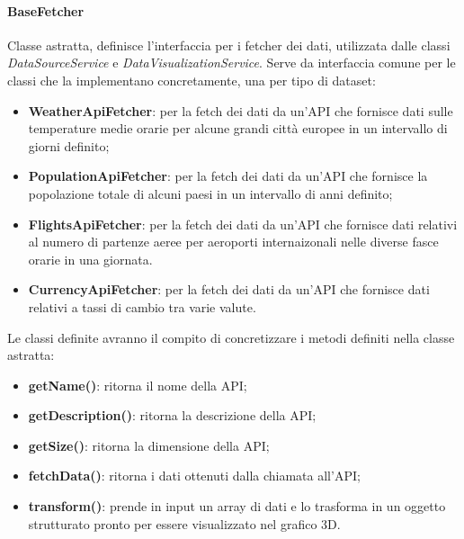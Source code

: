 \paragraph{BaseFetcher}
Classe astratta, definisce l'interfaccia per i fetcher dei dati, utilizzata dalle classi \textit{DataSourceService} e \textit{DataVisualizationService}.
Serve da interfaccia comune per le classi che la implementano concretamente, una per tipo di dataset:
\begin{itemize}
    \item \textbf{WeatherApiFetcher}: per la fetch dei dati da un'API che fornisce dati sulle temperature medie orarie per alcune grandi città europee in un intervallo di giorni definito;
    \item \textbf{PopulationApiFetcher}: per la fetch dei dati da un'API che fornisce la popolazione totale di alcuni paesi in un intervallo di anni definito;
    \item \textbf{FlightsApiFetcher}: per la fetch dei dati da un'API che fornisce dati relativi al numero di partenze aeree per aeroporti internaizonali nelle diverse fasce orarie in una giornata.
    \item \textbf{CurrencyApiFetcher}: per la fetch dei dati da un'API che fornisce dati relativi a tassi di cambio tra varie valute.
\end{itemize}
Le classi definite avranno il compito di concretizzare i metodi definiti nella classe astratta:
\begin{itemize}
    \item \textbf{getName()}: ritorna il nome della API;
    \item \textbf{getDescription()}: ritorna la descrizione della API;
    \item \textbf{getSize()}: ritorna la dimensione della API;
    \item \textbf{fetchData()}: ritorna i dati ottenuti dalla chiamata all'API;
    \item \textbf{transform()}: prende in input un array di dati e lo trasforma in un oggetto strutturato pronto per essere visualizzato nel grafico 3D.
\end{itemize}

